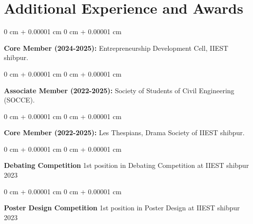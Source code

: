 \documentclass[10pt, letterpaper]{article}
\newenvironment{onecolentry}{
    \begin{adjustwidth}{
        0 cm + 0.00001 cm
    }{
        0 cm + 0.00001 cm
    }
}{
    \end{adjustwidth}
} %
\begin{document}
\section{Additional Experience and Awards}

\begin{onecolentry}
    \textbf{Core Member (2024-2025):} Entrepreneurship Development Cell, IIEST shibpur.
\end{onecolentry}
\vspace{0.05 cm}

\begin{onecolentry}
    \textbf{Associate Member (2022-2025):} Society of Students of Civil Engineering (SOCCE).
\end{onecolentry}
\vspace{0.05 cm}


\begin{onecolentry}
    \textbf{Core Member (2022-2025):} Les Thespians, Drama Society of IIEST shibpur. 
\end{onecolentry}
\vspace{0.05 cm}
\begin{onecolentry}
    \textbf{Debating Competition} 1st position in Debating Competition at IIEST shibpur 2023
\end{onecolentry}
\vspace{0.05 cm}
\begin{onecolentry}
  \textbf{Poster Design Competition} 1st position in Poster Design at IIEST shibpur 2023
\end{onecolentry}
\end{document}
